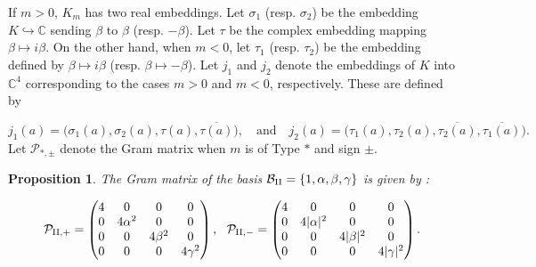 \documentclass[table]{amsart}
\newtheorem{proposition}[theorem]{Proposition}
\numberwithin{equation}{section}
\begin{document}
\par If $m>0$, $K_m$ has two real embeddings. Let $\sigma_1$ (resp. $\sigma_2$) be the embedding $K\hookrightarrow \mathbb{C}$ sending $\beta$ to $\beta$ (resp. $-\beta$). Let $\tau$ be the complex embedding mapping $\beta\mapsto i \beta$. On the other hand, when $m<0$, let $\tau_1$ (resp. $\tau_2$) be the embedding defined by $\beta\mapsto i\beta$ (resp. $\beta\mapsto -\beta$). Let $j_1$ and $j_2$ denote the embeddings of $K$ into $\mathbb{C}^4$ corresponding to the cases $m > 0$ and $m < 0$, respectively. These are defined by

$$
j_1(a) = \big(\sigma_1(a), \sigma_2(a), \tau(a), \overline{\tau(a)}\big), \quad \text{and} \quad 
j_2(a) = \big(\tau_1(a), \tau_2(a), \overline{\tau_2(a)}, \overline{\tau_1(a)}\big).
$$
\noindent Let $\mathcal{P}_{\ast, \pm}$ denote the Gram matrix when $m$ is of Type $\ast$ and sign $\pm$.
\begin{proposition}
The Gram matrix of the basis $ \mathcal{B}_{\rm{II}} = \{1,\alpha,\beta,\gamma\}$ is given by :

$$
\mathcal{P}_{\rm{II}, +}=  
\begin{pmatrix}
4 & 0 & 0 & 0 \\
0 & 4\alpha^2 & 0 & 0 \\
0 & 0 & 4\beta^2 & 0 \\
0 & 0 & 0 & 4\gamma^2
\end{pmatrix},\ \
\mathcal{P}_{\rm{II}, -}=  
\begin{pmatrix}
4 & 0 & 0 & 0 \\
0 & 4|\alpha|^2 & 0 & 0 \\
0 & 0 & 4|\beta|^2 & 0 \\
0 & 0 & 0 & 4|\gamma|^2
\end{pmatrix}.
$$

\end{proposition}
\end{document}
